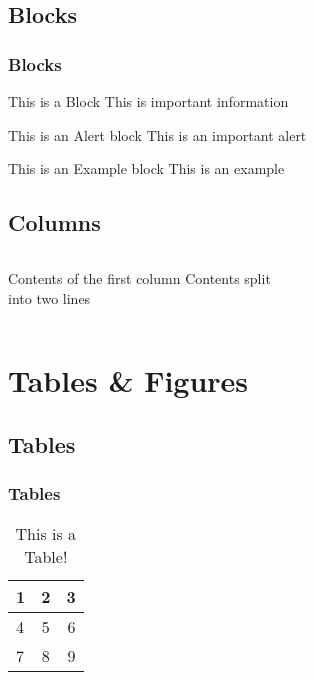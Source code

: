 \documentclass{beamer}
\begin{document}
		\subsection{Blocks}
			\begin{frame}
	 		\frametitle{Blocks}
			   \begin{block}{This is a Block}
			      This is important information
			   \end{block}
			 
			   \begin{alertblock}{This is an Alert block}
			   This is an important alert
			   \end{alertblock}

			   \begin{exampleblock}{This is an Example block}
			   This is an example 
			   \end{exampleblock}
			\end{frame}
		
		\subsection{Columns}
			\begin{frame}
		    \begin{columns}[c] %
		     Contents of the first column
		    \column{.5\textwidth}
		     Contents split \\ into two lines
		    \end{columns}
		\end{frame}
		 
		\begin{frame}

		\end{frame}
		
	\section{Tables \& Figures}
		\subsection{Tables}
		\begin{frame}
			\frametitle{Tables}
				 \begin{table}
				 	\begin{tabular}{ l | c || r | }
					    \hline
					    1 & 2 & 3 \\ \hline
					    4 & 5 & 6 \\ \hline
					    7 & 8 & 9 \\
					    \hline
					  \end{tabular}
				\caption{This is a Table!} 
				 \end{table}
		\end{frame}
\end{document}

